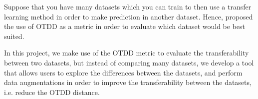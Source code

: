 \documentclass[10pt]{article}
\theoremstyle{definition}
\begin{document}
Suppose that you have many
datasets which you can train to then use a transfer learning method
in order to make prediction in another dataset. Hence,
\citet{alvarez2020geometric} proposed the use of OTDD as a metric
in order to evaluate which dataset would be best suited.

In this project, we make use of the OTDD metric to evaluate
the transferability between two datasets, but instead of
comparing many datasets, we develop a tool that allows users
to explore the differences between the datasets, and perform data
augmentations in order to improve the transferability between the datasets, i.e.
reduce the OTDD distance.



  
  
\end{document}
